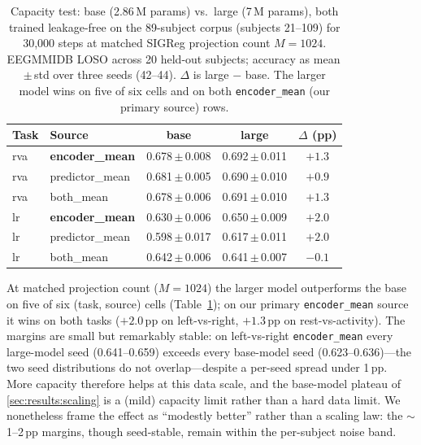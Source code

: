 \begin{table}[t]
\caption{Capacity test: base (2.86\,M params) vs.\ large (7\,M params),
both trained leakage-free on the 89-subject corpus (subjects 21--109) for
30{,}000 steps at matched SIGReg projection count $M{=}1024$. EEGMMIDB LOSO
across 20 held-out subjects; accuracy as mean\,$\pm$\,std over three seeds
(42--44). $\Delta$ is large $-$ base. The larger model wins on five of six
cells and on both \texttt{encoder\_mean} (our primary source) rows.}
\label{tab:capacity}
\centering
\small
\begin{tabular}{l l c c c}
\toprule
Task & Source & base & large & $\Delta$ (pp) \\
\midrule
rva & \textbf{encoder\_mean}   & 0.678\,$\pm$\,0.008 & 0.692\,$\pm$\,0.011 & $+1.3$  \\
rva & predictor\_mean & 0.681\,$\pm$\,0.005 & 0.690\,$\pm$\,0.010 & $+0.9$  \\
rva & both\_mean      & 0.678\,$\pm$\,0.006 & 0.691\,$\pm$\,0.010 & $+1.3$  \\
\midrule
lr  & \textbf{encoder\_mean}   & 0.630\,$\pm$\,0.006 & 0.650\,$\pm$\,0.009 & $+2.0$  \\
lr  & predictor\_mean & 0.598\,$\pm$\,0.017 & 0.617\,$\pm$\,0.011 & $+2.0$  \\
lr  & both\_mean      & 0.642\,$\pm$\,0.006 & 0.641\,$\pm$\,0.007 & $-0.1$  \\
\bottomrule
\end{tabular}
\end{table}

At matched projection count ($M{=}1024$) the larger model outperforms the
base on five of six (task, source) cells (Table~\ref{tab:capacity}); on our
primary \texttt{encoder\_mean} source it wins on both tasks ($+2.0$\,pp on
left-vs-right, $+1.3$\,pp on rest-vs-activity). The margins are small but
remarkably stable: on left-vs-right \texttt{encoder\_mean} every large-model
seed (0.641--0.659) exceeds every base-model seed (0.623--0.636)---the two
seed distributions do not overlap---despite a per-seed spread under 1\,pp.
More capacity therefore helps at this data scale, and the base-model plateau
of \cref{sec:results:scaling} is a (mild) capacity limit rather than a hard
data limit. We nonetheless frame the effect as ``modestly better'' rather
than a scaling law: the $\sim$1--2\,pp margins, though seed-stable, remain
within the per-subject noise band.

